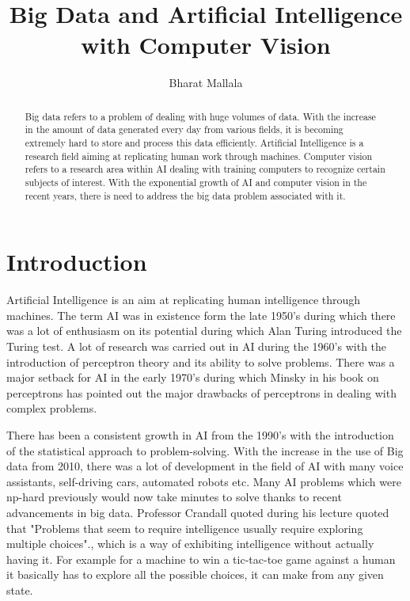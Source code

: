 \documentclass[sigconf]{acmart}
\begin{document}
\title{Big Data and Artificial Intelligence with Computer Vision}

\author{Bharat Mallala}








\begin{abstract}
Big data refers to a problem of dealing with huge volumes of data. With the increase in the amount of data generated every day from various fields, it is becoming extremely hard to store and process this data efficiently. Artificial Intelligence is a research field aiming at replicating human work through machines. Computer vision refers to a research area within AI dealing with training computers to recognize certain subjects of interest. With the exponential growth of AI and computer vision in the recent years, there is need to address the big data problem associated with it.
\end{abstract}



\maketitle

\section{Introduction}
Artificial Intelligence is an aim at replicating human intelligence through machines. The term AI was in existence form the late 1950's during which there was a lot of enthusiasm on its potential during which Alan Turing introduced the Turing test. A lot of research was carried out in AI during the 1960's with the introduction of perceptron theory and its ability to solve problems. There was a major setback for AI in the early 1970's during which Minsky in his book on perceptrons has pointed out the major drawbacks of perceptrons in dealing with complex problems.\cite{}

There has been a consistent growth in AI from the 1990's with the introduction of the statistical approach to problem-solving. With the increase in the use of Big data from 2010, there was a lot of development in the field of AI with many voice assistants, self-driving cars, automated robots etc. Many AI problems which were np-hard previously would now take minutes to solve thanks to recent advancements in big data. Professor Crandall quoted during his lecture quoted that "Problems that seem to require intelligence usually require exploring multiple choices".\cite{}, which is a way of exhibiting intelligence without actually having it. For example for a machine to win a tic-tac-toe game against a human it basically has to explore all the possible choices, it can make from any given state.
\end{document}
